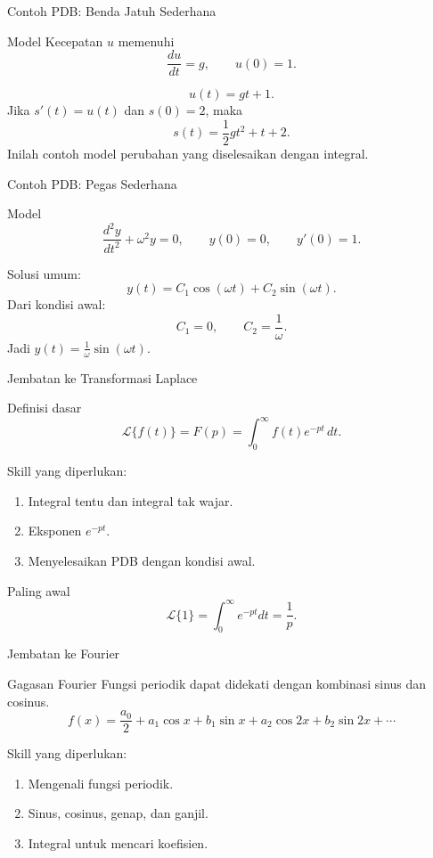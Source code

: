 \documentclass[aspectratio=169,11pt]{beamer}
\begin{document}
\begin{frame}{Contoh PDB: Benda Jatuh Sederhana}
\begin{exampleblock}{Model}
Kecepatan $u$ memenuhi
\[
\frac{du}{dt}=g,\qquad u(0)=1.
\]
\end{exampleblock}
\[
u(t)=gt+1.
\]
Jika $s'(t)=u(t)$ dan $s(0)=2$, maka
\[
s(t)=\frac{1}{2}gt^2+t+2.
\]
Inilah contoh model perubahan yang diselesaikan dengan integral.
\end{frame}

\begin{frame}{Contoh PDB: Pegas Sederhana}
\begin{exampleblock}{Model}
\[
\frac{d^2y}{dt^2}+\omega^2y=0,
\qquad y(0)=0,
\qquad y'(0)=1.
\]
\end{exampleblock}
Solusi umum:
\[
y(t)=C_1\cos(\omega t)+C_2\sin(\omega t).
\]
Dari kondisi awal:
\[
C_1=0,
\qquad C_2=\frac{1}{\omega}.
\]
Jadi $y(t)=\frac{1}{\omega}\sin(\omega t)$.
\end{frame}

\begin{frame}{Jembatan ke Transformasi Laplace}
\begin{block}{Definisi dasar}
\[
\mathcal{L}\{f(t)\}=F(p)=\int_0^\infty f(t)e^{-pt}\,dt.
\]
\end{block}
Skill yang diperlukan:
\begin{enumerate}
  \item Integral tentu dan integral tak wajar.
  \item Eksponen $e^{-pt}$.
  \item Menyelesaikan PDB dengan kondisi awal.
\end{enumerate}
\begin{exampleblock}{Paling awal}
\[
\mathcal{L}\{1\}=\int_0^\infty e^{-pt}dt=\frac{1}{p}.
\]
\end{exampleblock}
\end{frame}

\begin{frame}{Jembatan ke Fourier}
\begin{block}{Gagasan Fourier}
Fungsi periodik dapat didekati dengan kombinasi sinus dan cosinus.
\[
f(x)=\frac{a_0}{2}+a_1\cos x+b_1\sin x+a_2\cos 2x+b_2\sin 2x+\cdots
\]
\end{block}
Skill yang diperlukan:
\begin{enumerate}
  \item Mengenali fungsi periodik.
  \item Sinus, cosinus, genap, dan ganjil.
  \item Integral untuk mencari koefisien.
\end{enumerate}
\end{frame}
\end{document}
